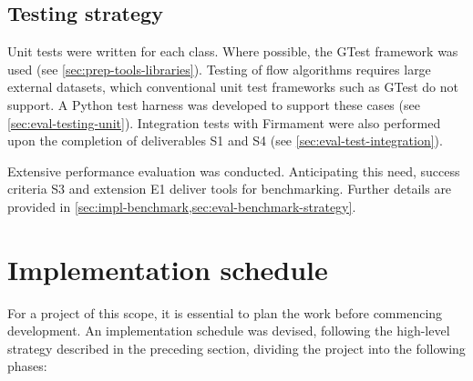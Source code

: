 
\subsection{Testing strategy}
\label{sec:prep-management-testing}
Unit tests were written for each class. Where possible, the GTest framework was used (see \cref{sec:prep-tools-libraries}). Testing of flow algorithms requires large external datasets, which conventional unit test frameworks such as GTest do not support. A Python test harness was developed to support these cases (see \cref{sec:eval-testing-unit}). Integration tests with Firmament were also performed upon the completion of deliverables S1 and S4 (see \cref{sec:eval-test-integration}).

Extensive performance evaluation was conducted. Anticipating this need, success criteria S3 and extension E1 deliver tools for benchmarking. Further details are provided in \cref{sec:impl-benchmark,sec:eval-benchmark-strategy}.

\section{Implementation schedule} \label{sec:prep-implsched}

%


For a project of this scope, it is essential to plan the work before commencing development. An implementation schedule was devised, following the high-level strategy described in the preceding section, dividing the project into the following phases:

